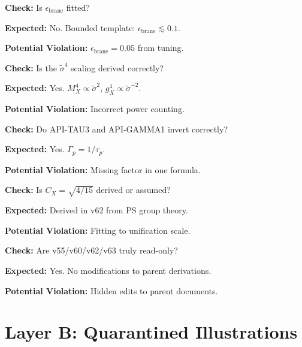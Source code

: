 \documentclass[11pt,a4paper]{article}
\theoremstyle{definition}
\begin{document}
\begin{trapbox}
\textbf{Check:} Is $\epsilon_{\text{brane}}$ fitted?

\textbf{Expected:} No. Bounded template: $\epsilon_{\text{brane}} \lesssim 0.1$.

\textbf{Potential Violation:} $\epsilon_{\text{brane}} = 0.05$ from tuning.
\end{trapbox}

\begin{trapbox}
\textbf{Check:} Is the $\tilde{\sigma}^4$ scaling derived correctly?

\textbf{Expected:} Yes. $M_X^4 \propto \tilde{\sigma}^2$, $g_X^4 \propto \tilde{\sigma}^{-2}$.

\textbf{Potential Violation:} Incorrect power counting.
\end{trapbox}

\begin{trapbox}
\textbf{Check:} Do API-TAU3 and API-GAMMA1 invert correctly?

\textbf{Expected:} Yes. $\Gamma_p = 1/\tau_p$.

\textbf{Potential Violation:} Missing factor in one formula.
\end{trapbox}

\begin{trapbox}
\textbf{Check:} Is $C_X = \sqrt{4/15}$ derived or assumed?

\textbf{Expected:} Derived in v62 from PS group theory.

\textbf{Potential Violation:} Fitting to unification scale.
\end{trapbox}

\begin{trapbox}
\textbf{Check:} Are v55/v60/v62/v63 truly read-only?

\textbf{Expected:} Yes. No modifications to parent derivations.

\textbf{Potential Violation:} Hidden edits to parent documents.
\end{trapbox}


\newpage
\section{Layer B: Quarantined Illustrations}
\label{sec:layer-b}
\end{document}
